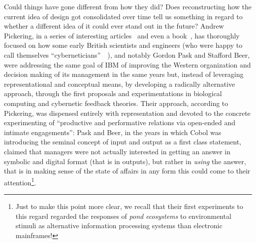 \documentclass{article}
\begin{document}
Could things have gone different from how they did? Does reconstructing how the current idea of design got consolidated over time tell us something in regard to whether a different idea of it could ever stand out in the future? Andrew Pickering, in a series of interesting articles~\citep{pickering_science_2004,pickering_beyond_2008} and even a book~\citep{pickering_cybernetic_2010}, has thoroughly focused on how some early British scientists and engineers (who were happy to call themselves ``cyberneticians''~~\citep[p. 223]{pickering_cybernetic_2010}), and notably Gordon Pask and Stafford Beer, were addressing the same goal of IBM of improving the Western organization and decision making of its management in the same years but, instead of leveraging representational and conceptual means, by developing a radically alternative approach, through the first proposals and experimentations in biological computing and cybernetic feedback theories. Their approach, according to Pickering, was dispensed entirely with representation and devoted to the concrete experimenting of ``productive and performative relations via open-ended and intimate engagements'': Pask and Beer, in the years in which Cobol was introducing the seminal concept of input and output as a first class statement, claimed that managers were not actually interested in getting an answer in symbolic and digital format (that is in outputs), but rather in \emph{using} the answer, that is in making sense of the state of affairs in any form this could come to their attention\footnote{Just to make this point more clear, we recall that their first experiments to this regard regarded the responses of \emph{pond ecosystems} to environmental stimuli as alternative information processing systems than electronic mainframes!}.
\end{document}
